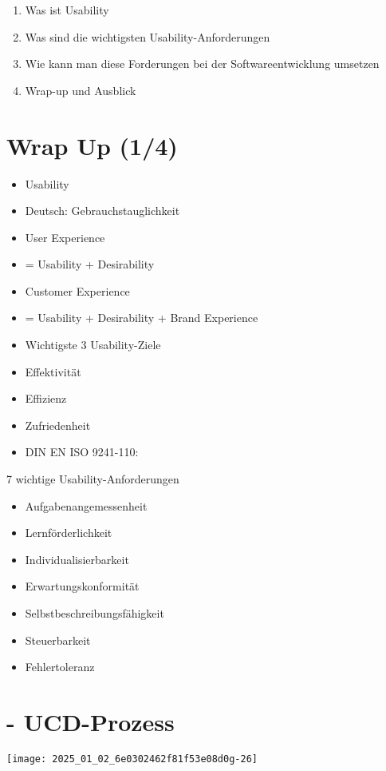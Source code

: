 \documentclass[10pt]{article}
\begin{document}
\begin{enumerate}
  \item Was ist Usability
  \item Was sind die wichtigsten Usability-Anforderungen
  \item Wie kann man diese Forderungen bei der Softwareentwicklung umsetzen
  \item Wrap-up und Ausblick
\end{enumerate}

\section*{Wrap Up (1/4)}
\begin{itemize}
  \item Usability
  \item Deutsch: Gebrauchstauglichkeit
  \item User Experience
  \item = Usability + Desirability
  \item Customer Experience
  \item = Usability + Desirability + Brand Experience
  \item Wichtigste 3 Usability-Ziele
  \item Effektivität
  \item Effizienz
  \item Zufriedenheit
  \item DIN EN ISO 9241-110:
\end{itemize}

7 wichtige Usability-Anforderungen

\begin{itemize}
  \item Aufgabenangemessenheit
  \item Lernförderlichkeit
  \item Individualisierbarkeit
  \item Erwartungskonformität
  \item Selbstbeschreibungsfähigkeit
  \item Steuerbarkeit
  \item Fehlertoleranz
\end{itemize}

\section*{- UCD-Prozess}
\begin{center}
\texttt{[image: 2025\_01\_02\_6e0302462f81f53e08d0g-26]}
\end{center}
\end{document}
